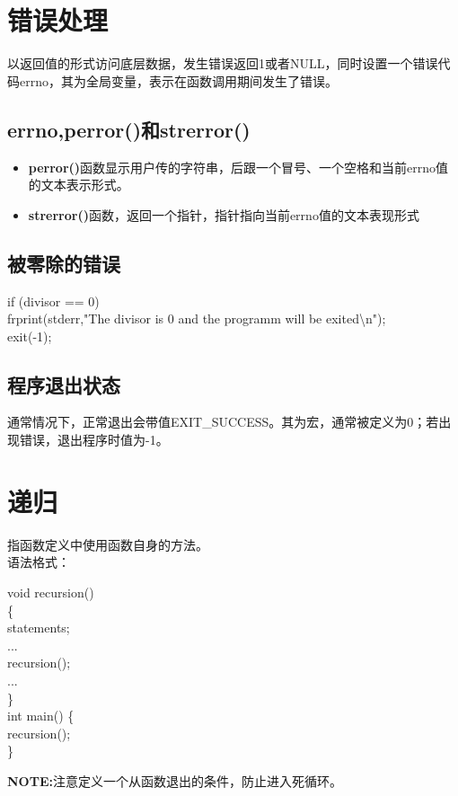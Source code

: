 \documentclass[UTF8]{ctexart}
\begin{document}
			\clearpage
			\section{错误处理}
			以返回值的形式访问底层数据，发生错误返回1或者NULL，同时设置一个错误代码errno，其为全局变量，表示在函数调用期间发生了错误。
			\subsection{errno,perror()和strerror()}
			\begin{itemize}
				\item \textbf{perror()}函数显示用户传的字符串，后跟一个冒号、一个空格和当前errno值的文本表示形式。
				\item \textbf{strerror()}函数，返回一个指针，指针指向当前errno值的文本表现形式
			\end{itemize}
			\subsection{被零除的错误}
			\begin{framed}
				if (divisor == 0){\\
					frprint(stderr,"The divisor is 0 and the programm will be exited\textbackslash n");\\
					exit(-1);\\
				}
			\end{framed}
			\subsection{程序退出状态}
			通常情况下，正常退出会带值EXIT\_SUCCESS。其为宏，通常被定义为0；若出现错误，退出程序时值为-1。
			
			\clearpage
			\section{递归}
			指函数定义中使用函数自身的方法。\\
			语法格式：
			\begin{framed}
				void recursion()\\
				\{\\
					statements;\\
					...\\
					recursion();\\
					...\\
				\}\\
				int main()
				\{\\
					recursion();\\
				\}
			\end{framed}
			\textbf{NOTE:}注意定义一个从函数退出的条件，防止进入死循环。
\end{document}

